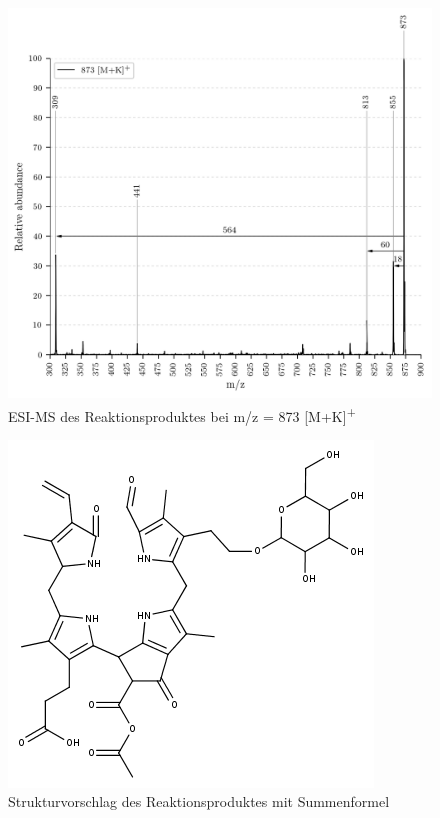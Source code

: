 \begin{figure}[htbp]
  \includegraphics[width=\textwidth, height=0.7\textwidth]{figures/Kapitel4/Kataboliten/VWA_MS_LeafSpray_873.png} 
  \caption[ESI-MS des Reaktionsproduktes von Bo-NCC-1, Quelle: Autor]{ESI-MS des Reaktionsproduktes bei m/z = 873 [M+K]\textsuperscript{+}}
  \label{fig:873MKLeafspray}
\end{figure}

\begin{figure}[htbp]
  \centering
  \includegraphics[scale=0.6]{figures/Kapitel4/Kataboliten/fragmentation_structures/VWA_Katabolit_873.png}
  \caption[Strukturvorschlag des Reaktionsproduktes von Bo-NCC-1, Quelle: Autor]{Strukturvorschlag des Reaktionsproduktes mit Summenformel }
  \label{fig:873MKstructure}
\end{figure}


